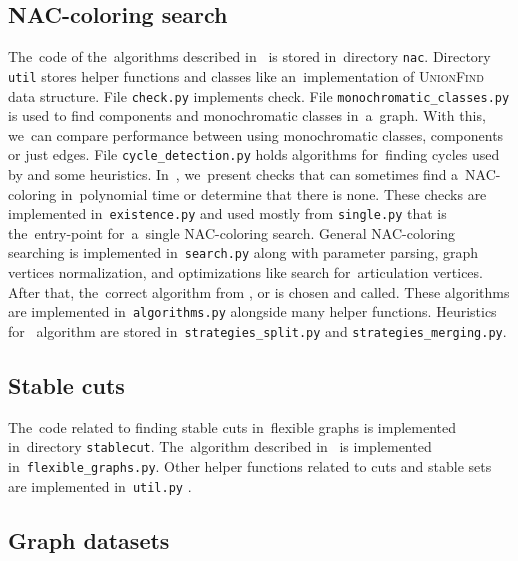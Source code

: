 \subsection{NAC-coloring search}

The~code of the~algorithms described in~
is stored in~directory \texttt{nac}.
%
Directory \texttt{util} stores helper functions and classes
like an~implementation of \textsc{UnionFind} data structure.
%
File \texttt{check.py} implements \IsNACColoring{} check.
%
File \texttt{monochromatic\_classes.py} is used to find \trcon{} components
and monochromatic classes in~a~graph. With this, we~can compare performance
between using monochromatic classes, \trcon{} components or just edges.
%
File \texttt{cycle\_detection.py} holds algorithms for~finding cycles
used by 
and some heuristics.
%
In~,
we~present checks that can
sometimes find a~NAC-coloring in~polynomial time
or determine that there is none.
These checks are implemented in~\texttt{existence.py} and
used mostly from \texttt{single.py} that is the~entry-point
for~a~single NAC-coloring search.
%
General NAC-coloring searching is implemented in~\texttt{search.py}
along with parameter parsing, graph vertices normalization, and
optimizations like search for~articulation vertices.
After that, the~correct algorithm from \Naive{}, \NaiveCycles{} or \Subgraphs{}
is chosen and called.
%
These algorithms are implemented in~\texttt{algorithms.py} alongside many helper functions.
Heuristics for~\Subgraphs{} algorithm are stored in~\texttt{strategies\_split.py}
and \texttt{strategies\_merging.py}.


\subsection{Stable cuts}

The~code related to finding stable cuts in~flexible graphs
is implemented in~directory \texttt{stablecut}.
%
The~algorithm described in~
is implemented in~\texttt{flexible\_graphs.py}.
Other helper functions related to cuts and stable sets
are implemented in~\texttt{util.py}%
.


\subsection{Graph datasets}

